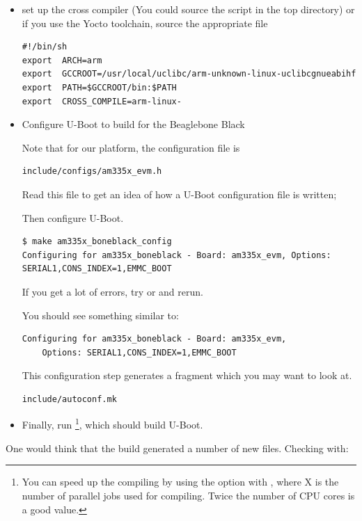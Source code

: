\begin{itemize}
\item set up the cross compiler (You could source the  script in the top directory)
or if you use the Yocto toolchain, source the appropriate  file
\begin{verbatim}
#!/bin/sh
export	ARCH=arm
export	GCCROOT=/usr/local/uclibc/arm-unknown-linux-uclibcgnueabihf
export	PATH=$GCCROOT/bin:$PATH
export	CROSS_COMPILE=arm-linux-
\end{verbatim}

\item Configure U-Boot to build for the Beaglebone Black

Note that for our platform, the configuration file is
\begin{verbatim}
include/configs/am335x_evm.h
\end{verbatim}
Read this file to get an
  idea of how a U-Boot configuration file is written;

Then configure U-Boot.

\begin{verbatim}
$ make am335x_boneblack_config
Configuring for am335x_boneblack - Board: am335x_evm, Options: SERIAL1,CONS_INDEX=1,EMMC_BOOT
\end{verbatim}

If you get a lot of errors, try  or  and rerun.


You should see something similar to:
\begin{verbatim}
Configuring for am335x_boneblack - Board: am335x_evm,
    Options: SERIAL1,CONS_INDEX=1,EMMC_BOOT
\end{verbatim}

This configuration step generates a  fragment which you may want to look at.

\begin{verbatim}
include/autoconf.mk
\end{verbatim}

\item Finally, run \footnote{You can speed up the compiling
  by using the  option with , where X is the number of parallel
  jobs used for compiling. Twice the number of CPU cores is a good
  value.}, which should build U-Boot.

\end{itemize}

One would think that the build generated a number of new files. Checking with:

